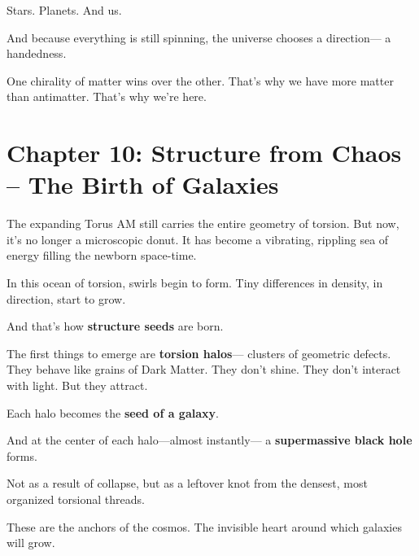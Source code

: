 \documentclass{article}
\begin{document}
\vspace{1ex}
\noindent
Stars.  
Planets.  
And us.

\vspace{1ex}
\noindent
And because everything is still spinning,  
the universe chooses a direction—  
a handedness.

\vspace{1ex}
\noindent
One chirality of matter wins over the other.  
That’s why we have more matter than antimatter.  
That’s why we’re here.



\section*{Chapter 10: Structure from Chaos – The Birth of Galaxies}

\noindent
The expanding Torus AM still carries the entire geometry of torsion.  
But now, it’s no longer a microscopic donut.  
It has become a vibrating, rippling sea of energy  
filling the newborn space-time.

\vspace{1ex}
\noindent
In this ocean of torsion, swirls begin to form.  
Tiny differences in density, in direction,  
start to grow.

\vspace{1ex}
\noindent
And that’s how \textbf{structure seeds} are born.

\vspace{1ex}
\noindent
The first things to emerge are \textbf{torsion halos}—  
clusters of geometric defects.  
They behave like grains of Dark Matter.  
They don’t shine.  
They don’t interact with light.  
But they attract.

\vspace{1ex}
\noindent
Each halo becomes the \textbf{seed of a galaxy}.

\vspace{1ex}
\noindent
And at the center of each halo—almost instantly—  
a \textbf{supermassive black hole} forms.

\vspace{1ex}
\noindent
Not as a result of collapse,  
but as a leftover knot  
from the densest, most organized torsional threads.

\vspace{1ex}
\noindent
These are the anchors of the cosmos.  
The invisible heart around which galaxies will grow.
\end{document}
